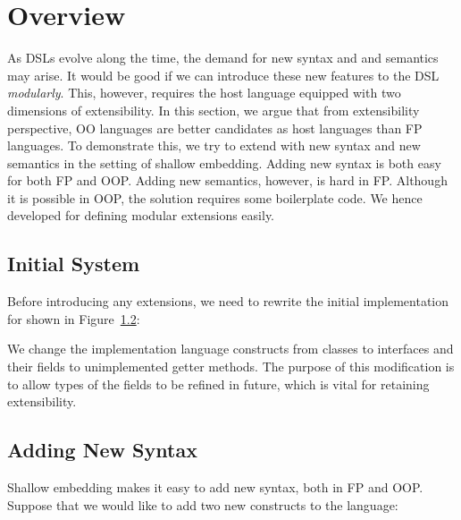 \section{Overview}

\begin{comment}
Weixin writes this one.

Go over jeremy's examples, maybe having only 3 diagram 
constructs instead of 5 for space reasons.

Use five constructs to show extensibility.

Think of how to introduce our tool? Using the Jeremy's examples? 
or introducing before with some other examples?

\end{comment}

As DSLs evolve along the time, the demand for new syntax and and semantics may arise.
It would be good if we can introduce these new features to the DSL \emph{modularly}.
This, however, requires the host language equipped with two dimensions of
extensibility.
In this section, we argue that from extensibility perspective, OO languages are
better candidates as host languages than FP languages.
To demonstrate this, we try to extend \dsl with new syntax and new semantics in
the setting of shallow embedding. Adding new syntax is both easy for both FP
and OOP. Adding new semantics, however, is hard in FP. Although it is possible
in OOP, the solution requires some boilerplate code. We hence developed \name
for defining modular extensions easily.

\subsection{Initial System}
Before introducing any extensions, we need to rewrite the initial implementation for \dsl shown in Figure~\ref{}:

We change the implementation language constructs from classes to interfaces and
their fields to unimplemented getter methods. The purpose of this modification
is to allow types of the fields to be refined in future, which is vital for
retaining extensibility.

\subsection{Adding New Syntax}
Shallow embedding makes it easy to add new syntax, both in FP and OOP.
Suppose that we would like to add two new constructs to the language:

